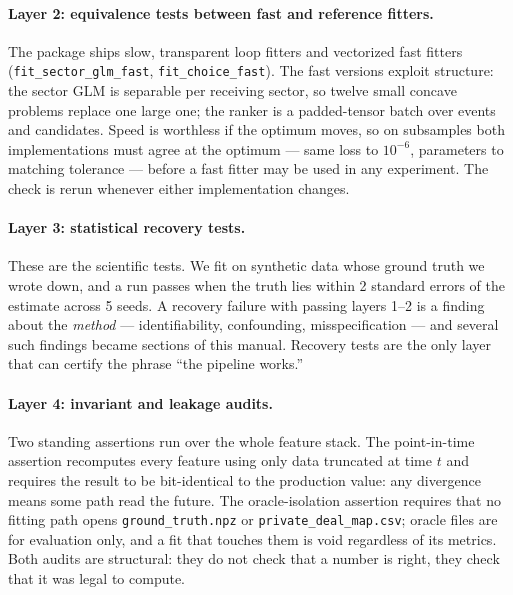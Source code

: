 \paragraph{Layer 2: equivalence tests between fast and reference fitters.} The package ships slow,
transparent loop fitters and vectorized fast fitters (\texttt{fit\_sector\_glm\_fast},
\texttt{fit\_choice\_fast}). The fast versions exploit structure: the sector GLM is separable per receiving
sector, so twelve small concave problems replace one large one; the ranker is a padded-tensor batch over
events and candidates. Speed is worthless if the optimum moves, so on subsamples both implementations must
agree at the optimum --- same loss to $10^{-6}$, parameters to matching tolerance --- before a fast fitter may
be used in any experiment. The check is rerun whenever either implementation changes.

\paragraph{Layer 3: statistical recovery tests.} These are the scientific tests. We fit on synthetic data
whose ground truth we wrote down, and a run passes when the truth lies within 2 standard errors of the
estimate across 5 seeds. A recovery failure with passing layers 1--2 is a finding about the \emph{method}
--- identifiability, confounding, misspecification --- and several such findings became sections of this
manual. Recovery tests are the only layer that can certify the phrase ``the pipeline works.''

\paragraph{Layer 4: invariant and leakage audits.} Two standing assertions run over the whole feature
stack. The point-in-time assertion recomputes every feature using only data truncated at time $t$ and
requires the result to be bit-identical to the production value: any divergence means some path read the
future. The oracle-isolation assertion requires that no fitting path opens \texttt{ground\_truth.npz} or
\texttt{private\_deal\_map.csv}; oracle files are for evaluation only, and a fit that touches them is void
regardless of its metrics. Both audits are structural: they do not check that a number is right, they check
that it was legal to compute.

